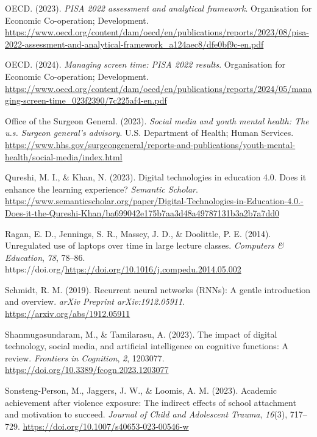 \documentclass[
  titlepage]{article}
\newlength{\cslhangindent}
\newenvironment{CSLReferences}[2] %
 {\begin{list}{}{%
  \setlength{\itemindent}{0pt}
  \setlength{\leftmargin}{0pt}
  \setlength{\parsep}{0pt}
  \ifodd #1
   \setlength{\leftmargin}{\cslhangindent}
   \setlength{\itemindent}{-1\cslhangindent}
  \fi
  \setlength{\itemsep}{#2\baselineskip}}}
 {\end{list}}
\begin{document}
\begin{CSLReferences}{1}{0}
OECD. (2023). \emph{PISA 2022 assessment and analytical framework}.
Organisation for Economic Co-operation; Development.
\url{https://www.oecd.org/content/dam/oecd/en/publications/reports/2023/08/pisa-2022-assessment-and-analytical-framework_a124aec8/dfe0bf9c-en.pdf}

OECD. (2024). \emph{Managing screen time: PISA 2022 results}.
Organisation for Economic Co-operation; Development.
\url{https://www.oecd.org/content/dam/oecd/en/publications/reports/2024/05/managing-screen-time_023f2390/7c225af4-en.pdf}

Office of the Surgeon General. (2023). \emph{Social media and youth
mental health: The u.s. Surgeon general's advisory}. U.S. Department of
Health; Human Services.
\url{https://www.hhs.gov/surgeongeneral/reports-and-publications/youth-mental-health/social-media/index.html}

Qureshi, M. I., \& Khan, N. (2023). Digital technologies in education
4.0. Does it enhance the learning experience? \emph{Semantic Scholar}.
\url{https://www.semanticscholar.org/paper/Digital-Technologies-in-Education-4.0.-Does-it-the-Qureshi-Khan/ba699042e175b7aa3d48a49787131b3a2b7a7dd0}

Ragan, E. D., Jennings, S. R., Massey, J. D., \& Doolittle, P. E.
(2014). Unregulated use of laptops over time in large lecture classes.
\emph{Computers \& Education}, \emph{78}, 78--86.
https://doi.org/\url{https://doi.org/10.1016/j.compedu.2014.05.002}

Schmidt, R. M. (2019). Recurrent neural networks (RNNs): A gentle
introduction and overview. \emph{arXiv Preprint arXiv:1912.05911}.
\url{https://arxiv.org/abs/1912.05911}

Shanmugasundaram, M., \& Tamilarasu, A. (2023). The impact of digital
technology, social media, and artificial intelligence on cognitive
functions: A review. \emph{Frontiers in Cognition}, \emph{2}, 1203077.
\url{https://doi.org/10.3389/fcogn.2023.1203077}

Sonsteng-Person, M., Jaggers, J. W., \& Loomis, A. M. (2023). Academic
achievement after violence exposure: The indirect effects of school
attachment and motivation to succeed. \emph{Journal of Child and
Adolescent Trauma}, \emph{16}(3), 717--729.
\url{https://doi.org/10.1007/s40653-023-00546-w}


\end{CSLReferences}
\end{document}
